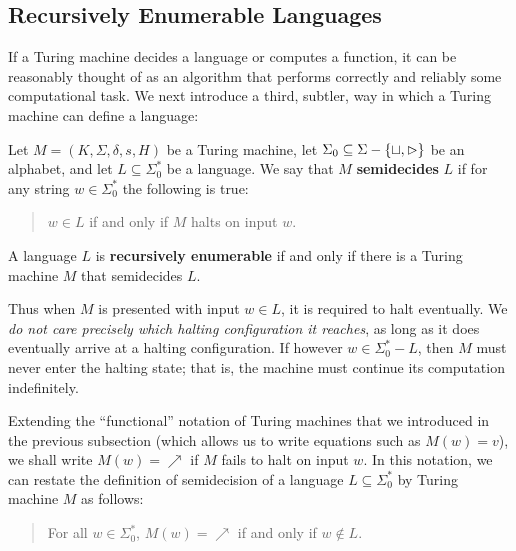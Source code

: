 \subsection{Recursively Enumerable Languages}

If a Turing machine decides a language or computes a function, it can be reasonably thought of as an algorithm that performs correctly and reliably some computational task. We next introduce a third, subtler, way in which a Turing machine can define a language: 
\begin{definition}{}
Let $M = (K, \Sigma, \delta, s, H)$ be a Turing machine, let $\Sigma_0 \subseteq \Sigma - \{ \sqcup, \vartriangleright \}$ be an alphabet, and let $L \subseteq \Sigma_0^*$ be a language. We say that $M$ \textbf{semidecides} $L$ if for any string $w \in \Sigma_0^*$ the following is true:
\begin{quote}
  $w \in L$ if and only if $M$ halts on input $w$.
\end{quote}
A language $L$ is \textbf{recursively enumerable} if and only if there is a Turing machine $M$ that semidecides $L$.
\end{definition}

Thus when $M$ is presented with input $w \in L$, it is required to halt eventually. We \textit{do not care precisely which halting configuration it reaches}, as long as it does eventually arrive at a halting configuration. If however $w \in \Sigma_0^* - L$, then $M$ must never enter the halting state; that is, the machine must continue its computation indefinitely.

Extending the ``functional'' notation of Turing machines that we introduced in the previous subsection (which allows us to write equations such as $M(w) = v$), we shall write $M(w) = \nearrow$ if $M$ fails to halt on input $w$. In this notation, we can restate the definition of semidecision of a language $L \subseteq \Sigma_0^*$ by Turing machine $M$ as follows:
\begin{quote}
  For all $w \in \Sigma_0^*$, $M(w) = \nearrow$ if and only if $w \notin L$.
\end{quote}

